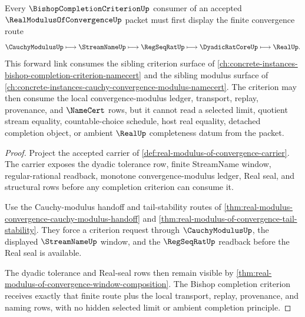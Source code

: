 \begin{theorem}
\label{thm:real-modulus-of-convergence-bishop-criterion-forward-link}
Every $\BishopCompletionCriterionUp$ consumer of an accepted $\RealModulusOfConvergenceUp$ packet must first display the finite convergence route
$$
\CauchyModulusUp \longmapsto \StreamNameUp \longmapsto \RegSeqRatUp \longmapsto \DyadicRatCoreUp \longmapsto \RealUp .
$$
This forward link consumes the sibling criterion surface of \autoref{ch:concrete-instances-bishop-completion-criterion-namecert} and the sibling modulus surface of \autoref{ch:concrete-instances-cauchy-convergence-modulus-namecert}.
The criterion may then consume the local convergence-modulus ledger, transport, replay, provenance, and $\NameCert$ rows, but it cannot read a selected limit, quotient stream equality, countable-choice schedule, host real equality, detached completion object, or ambient $\RealUp$ completeness datum from the packet.
\end{theorem}
\begin{proof}
Project the accepted carrier of \autoref{def:real-modulus-of-convergence-carrier}. The carrier exposes the dyadic tolerance row, finite StreamName window, regular-rational readback, monotone convergence-modulus ledger, Real seal, and structural rows before any completion criterion can consume it.

Use the Cauchy-modulus handoff and tail-stability routes of \autoref{thm:real-modulus-convergence-cauchy-modulus-handoff} and \autoref{thm:real-modulus-of-convergence-tail-stability}. They force a criterion request through $\CauchyModulusUp$, the displayed $\StreamNameUp$ window, and the $\RegSeqRatUp$ readback before the Real seal is available.

The dyadic tolerance and Real-seal rows then remain visible by \autoref{thm:real-modulus-of-convergence-window-composition}. The Bishop completion criterion receives exactly that finite route plus the local transport, replay, provenance, and naming rows, with no hidden selected limit or ambient completion principle.
\end{proof}
